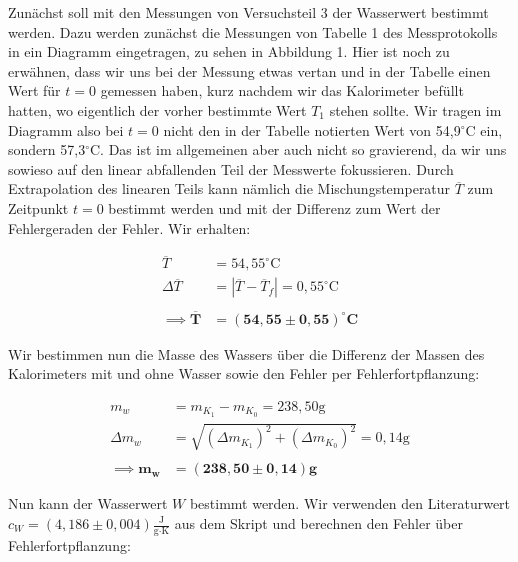\documentclass{article}
\begin{document}
Zunächst soll mit den Messungen von Versuchsteil 3 der Wasserwert bestimmt werden. Dazu werden zunächst die Messungen von Tabelle 1 des Messprotokolls in ein Diagramm eingetragen, zu sehen in Abbildung 1. Hier ist noch zu erwähnen, dass wir uns bei der Messung etwas vertan und in der Tabelle einen Wert für $t=0$ gemessen haben, kurz nachdem wir das Kalorimeter befüllt hatten, wo eigentlich der vorher bestimmte Wert $T_1$ stehen sollte. Wir tragen im Diagramm also bei $t=0$ nicht den in der Tabelle notierten Wert von 54,9$^\circ$C ein, sondern 57,3$^\circ$C. Das ist im allgemeinen aber auch nicht so gravierend, da wir uns sowieso auf den linear abfallenden Teil der Messwerte fokussieren. Durch Extrapolation des linearen Teils kann nämlich die Mischungstemperatur $\overline{T}$ zum Zeitpunkt $t=0$ bestimmt werden und mit der Differenz zum Wert der Fehlergeraden der Fehler. Wir erhalten:

\begin{equation}
\begin{split}
    \overline{T} &= 54,55^\circ \text{C} \\
    \Delta \overline{T} &= | \overline{T} - \overline{T}_f | = 0,55^\circ \text{C} \\ \\
    \implies \bm{\overline{T}} &= \bm{(54,55 \pm 0,55)^\circ} \textbf{C}
\end{split}
\end{equation}

Wir bestimmen nun die Masse des Wassers über die Differenz der Massen des Kalorimeters mit und ohne Wasser sowie den Fehler per Fehlerfortpflanzung:

\begin{equation}
    \begin{split}
        m_w &= m_{K_1} - m_{K_0} = 238,50 \text{g} \\
        \Delta m_w &= \sqrt{(\Delta m_{K_1})^2 + (\Delta m_{K_0})^2} = 0,14 \text{g} \\ \\
        \implies \bm{m_w} &= \bm{(238,50 \pm 0,14)} \textbf{g}
    \end{split}
\end{equation}

Nun kann der Wasserwert $W$ bestimmt werden. Wir verwenden den Literaturwert $c_W = (4,186 \pm 0,004) \frac{\text{J}}{\text{g} \cdot \text{K}}$ aus dem Skript und berechnen den Fehler über Fehlerfortpflanzung:
\end{document}
